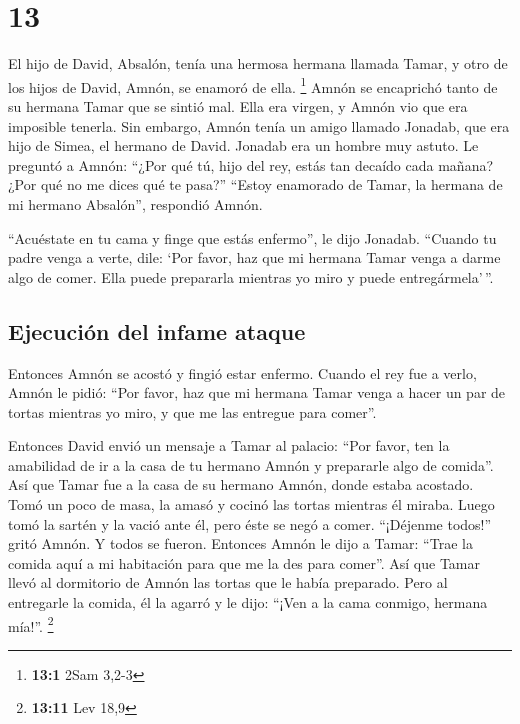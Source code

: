 \hypertarget{section-12}{%
\section{13}\label{section-12}}

 El hijo de David, Absalón, tenía una hermosa hermana
llamada Tamar, y otro de los hijos de David, Amnón, se enamoró de ella.
\footnote{\textbf{13:1} 2Sam 3,2-3}  Amnón se encaprichó
tanto de su hermana Tamar que se sintió mal. Ella era virgen, y Amnón
vio que era imposible tenerla.  Sin embargo, Amnón tenía
un amigo llamado Jonadab, que era hijo de Simea, el hermano de David.
Jonadab era un hombre muy astuto.  Le preguntó a Amnón:
``¿Por qué tú, hijo del rey, estás tan decaído cada mañana? ¿Por qué no
me dices qué te pasa?'' ``Estoy enamorado de Tamar, la hermana de mi
hermano Absalón'', respondió Amnón.

 ``Acuéstate en tu cama y finge que estás enfermo'', le
dijo Jonadab. ``Cuando tu padre venga a verte, dile: `Por favor, haz que
mi hermana Tamar venga a darme algo de comer. Ella puede prepararla
mientras yo miro y puede entregármela'\,''.

\hypertarget{ejecuciuxf3n-del-infame-ataque}{%
\subsection{Ejecución del infame
ataque}\label{ejecuciuxf3n-del-infame-ataque}}

 Entonces Amnón se acostó y fingió estar enfermo. Cuando
el rey fue a verlo, Amnón le pidió: ``Por favor, haz que mi hermana
Tamar venga a hacer un par de tortas mientras yo miro, y que me las
entregue para comer''.

 Entonces David envió un mensaje a Tamar al palacio: ``Por
favor, ten la amabilidad de ir a la casa de tu hermano Amnón y
prepararle algo de comida''.  Así que Tamar fue a la casa
de su hermano Amnón, donde estaba acostado. Tomó un poco de masa, la
amasó y cocinó las tortas mientras él miraba.  Luego tomó
la sartén y la vació ante él, pero éste se negó a comer. ``¡Déjenme
todos!'' gritó Amnón. Y todos se fueron.  Entonces Amnón
le dijo a Tamar: ``Trae la comida aquí a mi habitación para que me la
des para comer''. Así que Tamar llevó al dormitorio de Amnón las tortas
que le había preparado.  Pero al entregarle la comida, él
la agarró y le dijo: ``¡Ven a la cama conmigo, hermana mía!''.
\footnote{\textbf{13:11} Lev 18,9}

